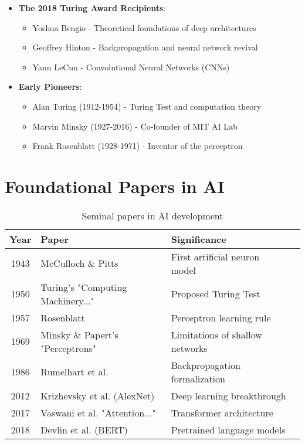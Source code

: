 \documentclass[openany]{book}
\begin{document}
\begin{itemize}
    \item \textbf{The 2018 Turing Award Recipients}:
    \begin{itemize}
        \item Yoshua Bengio - Theoretical foundations of deep architectures
        \item Geoffrey Hinton - Backpropagation and neural network revival
        \item Yann LeCun - Convolutional Neural Networks (CNNs)
    \end{itemize}
    
    \item \textbf{Early Pioneers}:
    \begin{itemize}
        \item Alan Turing (1912-1954) - Turing Test and computation theory
        \item Marvin Minsky (1927-2016) - Co-founder of MIT AI Lab
        \item Frank Rosenblatt (1928-1971) - Inventor of the perceptron
    \end{itemize}
\end{itemize}

\section{Foundational Papers in AI}

\begin{table}[H]
\centering
\begin{tabular}{c|lp{2in}p{1in}}
\hline
\textbf{Year} & \textbf{Paper} & \textbf{Significance} \\ \hline
1943 & McCulloch \& Pitts & First artificial neuron model \\ \hline
1950 & Turing's "Computing Machinery..." & Proposed Turing Test \\ \hline
1957 & Rosenblatt & Perceptron learning rule \\ \hline
1969 & Minsky \& Papert's "Perceptrons" & Limitations of shallow 
networks \\ \hline
1986 & Rumelhart et al. & Backpropagation formalization \\ \hline
2012 & Krizhevsky et al. (AlexNet) & Deep learning breakthrough \\ \hline
2017 & Vaswani et al. "Attention..." & Transformer architecture \\ \hline
2018 & Devlin et al. (BERT) & Pretrained language models \\ \hline
\end{tabular}
\caption{Seminal papers in AI development}
\end{table}
\end{document}
